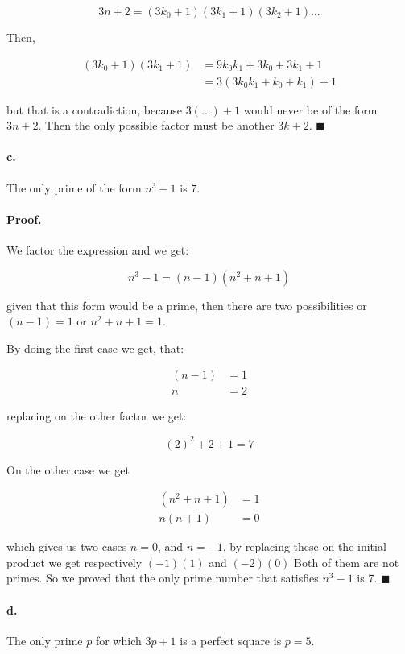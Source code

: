 \documentclass{article}
\begin{document}
$$3n + 2 = (3k_0 + 1) (3k_1 + 1) (3k_2 + 1) \dots$$

Then,

\begin{align*}
  (3k_0 + 1)(3k_1 + 1) &= 9k_0k_1 + 3k_0 + 3k_1 + 1\\
  &= 3(3k_0k_1 + k_0 + k_1) + 1
\end{align*}

but that is a contradiction, because $3(\dots) + 1$ would never be of the form $3n + 2$. Then the only possible factor must be another $3k +2$. $\blacksquare$

\paragraph{c.} The only prime of the form $n^3 - 1$ is $7$.

\paragraph{Proof.} We factor the expression and we get:

$$n^3 - 1 = (n - 1)(n^2 + n + 1)$$

given that this form would be a prime, then there are two possibilities or $(n - 1) = 1$ or $n^2 + n + 1 = 1$.

By doing the first case we get, that:

\begin{align*}
    (n - 1) &=  1\\
    n &= 2
\end{align*}

replacing on the other factor we get:

$$(2)^2 + 2 + 1 = 7$$

On the other case we get

\begin{align*}
    (n^2 + n + 1) &=  1\\
    n(n + 1) &= 0
\end{align*}

which gives us two cases $n=0$, and $n = -1$, by replacing these on the initial product we get respectively $(-1)(1)$ and $(-2)(0)$ Both of them are not primes. So we proved that the only prime number that satisfies $n^3 - 1$ is 7. $\blacksquare$

\paragraph{d.} The only prime $p$ for which $3p + 1$ is a perfect square is $p = 5$.
\end{document}
